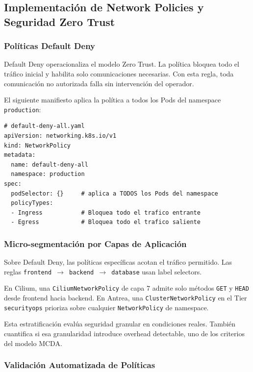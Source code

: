 \subsection{Implementación de Network Policies y Seguridad Zero Trust}

\subsubsection{Políticas Default Deny}

Default Deny operacionaliza el modelo Zero Trust. La política bloquea todo el tráfico inicial y habilita solo comunicaciones necesarias. Con esta regla, toda comunicación no autorizada falla sin intervención del operador.

El siguiente manifiesto aplica la política a todos los Pods del namespace \texttt{production}:

\begin{lstlisting}
# default-deny-all.yaml
apiVersion: networking.k8s.io/v1
kind: NetworkPolicy
metadata:
  name: default-deny-all
  namespace: production
spec:
  podSelector: {}     # aplica a TODOS los Pods del namespace
  policyTypes:
  - Ingress           # Bloquea todo el trafico entrante
  - Egress            # Bloquea todo el trafico saliente
\end{lstlisting}

\subsubsection{Micro-segmentación por Capas de Aplicación}

Sobre Default Deny, las políticas específicas acotan el tráfico permitido. Las reglas \texttt{frontend $\rightarrow$ backend $\rightarrow$ database} usan label selectors.

En Cilium, una \texttt{CiliumNetworkPolicy} de capa 7 admite solo métodos \texttt{GET} y \texttt{HEAD} desde frontend hacia backend. En Antrea, una \texttt{ClusterNetworkPolicy} en el Tier \texttt{securityops} prioriza sobre cualquier \texttt{NetworkPolicy} de namespace.

Esta estratificación evalúa seguridad granular en condiciones reales. También cuantifica si esa granularidad introduce overhead detectable, uno de los criterios del modelo MCDA.

\subsubsection{Validación Automatizada de Políticas}

